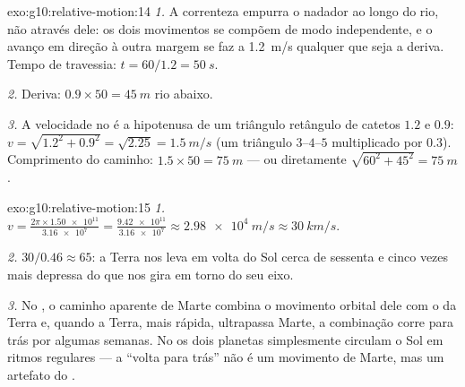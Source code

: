 \begin{solution}{exo:g10:relative-motion:14}
\emph{1.} A correnteza empurra o nadador ao longo do rio, não através
dele: os dois movimentos se compõem de modo independente, e o avanço em
direção à outra margem se faz a \qty{1.2}{m/s} qualquer que seja a
deriva. Tempo de travessia: $t = 60/1.2 = \qty{50}{s}$.

\emph{2.} Deriva: $0.9 \times 50 = \qty{45}{m}$ rio abaixo.

\emph{3.} A velocidade no  é a hipotenusa de um
triângulo retângulo de catetos $1.2$ e $0.9$:
$v = \sqrt{1.2^2 + 0.9^2} = \sqrt{2.25} = \qty{1.5}{m/s}$ (um triângulo
$3$--$4$--$5$ multiplicado por $0.3$). Comprimento do caminho:
$1.5 \times 50 = \qty{75}{m}$ --- ou diretamente
$\sqrt{60^2 + 45^2} = \qty{75}{m}$.
\end{solution}

\begin{solution}{exo:g10:relative-motion:15}
\emph{1.} $v = \frac{2\pi \times \num{1.50e11}}{\num{3.16e7}}
= \frac{\num{9.42e11}}{\num{3.16e7}} \approx \qty{2.98e4}{m/s}
\approx \qty{30}{km/s}$.

\emph{2.} $30 / 0.46 \approx 65$: a Terra nos leva em volta do Sol cerca
de sessenta e cinco vezes mais depressa do que nos gira em torno do seu
eixo.

\emph{3.} No , o caminho aparente de Marte combina
o movimento orbital dele com o da Terra e, quando a Terra, mais rápida,
ultrapassa Marte, a combinação corre para trás por algumas semanas. No
 os dois planetas simplesmente circulam o Sol em
ritmos regulares --- a ``volta para trás'' não é um movimento de Marte,
mas um artefato do .
\end{solution}


